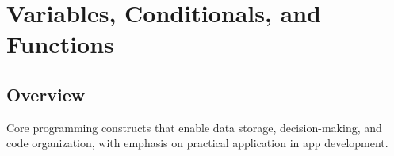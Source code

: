 \chapter{Variables, Conditionals, and Functions}

\section*{Overview}
Core programming constructs that enable data storage, decision-making, and code organization, with emphasis on practical application in app development.

